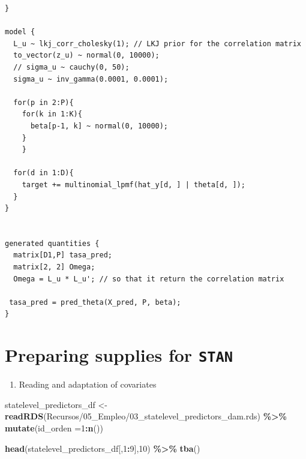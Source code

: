 \documentclass[
  12pt,
]{book}
\newenvironment{Shaded}{\begin{snugshade}}{\end{snugshade}}
\newcommand{\AttributeTok}[1]{\textcolor[rgb]{0.13,0.29,0.53}{#1}}
\newcommand{\DecValTok}[1]{\textcolor[rgb]{0.00,0.00,0.81}{#1}}
\newcommand{\FunctionTok}[1]{\textcolor[rgb]{0.13,0.29,0.53}{\textbf{#1}}}
\newcommand{\NormalTok}[1]{#1}
\newcommand{\OtherTok}[1]{\textcolor[rgb]{0.56,0.35,0.01}{#1}}
\newcommand{\SpecialCharTok}[1]{\textcolor[rgb]{0.81,0.36,0.00}{\textbf{#1}}}
\newcommand{\StringTok}[1]{\textcolor[rgb]{0.31,0.60,0.02}{#1}}
\providecommand{\tightlist}{%
  \setlength{\itemsep}{0pt}\setlength{\parskip}{0pt}}
\begin{document}
\begin{verbatim}
}

model {
  L_u ~ lkj_corr_cholesky(1); // LKJ prior for the correlation matrix
  to_vector(z_u) ~ normal(0, 10000);
  // sigma_u ~ cauchy(0, 50);
  sigma_u ~ inv_gamma(0.0001, 0.0001);
  
  for(p in 2:P){
    for(k in 1:K){
      beta[p-1, k] ~ normal(0, 10000);
    }
    }
  
  for(d in 1:D){
    target += multinomial_lpmf(hat_y[d, ] | theta[d, ]); 
  }
}

  
generated quantities {
  matrix[D1,P] tasa_pred;
  matrix[2, 2] Omega;
  Omega = L_u * L_u'; // so that it return the correlation matrix
  
 tasa_pred = pred_theta(X_pred, P, beta);
}
\end{verbatim}

\hypertarget{preparing-supplies-for-stan}{%
\section{\texorpdfstring{Preparing supplies for \texttt{STAN}}{Preparing supplies for STAN}}\label{preparing-supplies-for-stan}}

\begin{enumerate}
\def\labelenumi{\arabic{enumi}.}
\tightlist
\item
  Reading and adaptation of covariates
\end{enumerate}

\begin{Shaded}
\begin{Highlighting}[]
\NormalTok{statelevel\_predictors\_df }\OtherTok{\textless{}{-}} 
  \FunctionTok{readRDS}\NormalTok{(}\StringTok{\textquotesingle{}Recursos/05\_Empleo/03\_statelevel\_predictors\_dam.rds\textquotesingle{}}\NormalTok{) }\SpecialCharTok{\%\textgreater{}\%} 
  \FunctionTok{mutate}\NormalTok{(}\AttributeTok{id\_orden =}\DecValTok{1}\SpecialCharTok{:}\FunctionTok{n}\NormalTok{())}

\FunctionTok{head}\NormalTok{(statelevel\_predictors\_df[,}\DecValTok{1}\SpecialCharTok{:}\DecValTok{9}\NormalTok{],}\DecValTok{10}\NormalTok{) }\SpecialCharTok{\%\textgreater{}\%} \FunctionTok{tba}\NormalTok{()}
\end{Highlighting}
\end{Shaded}
\end{document}
